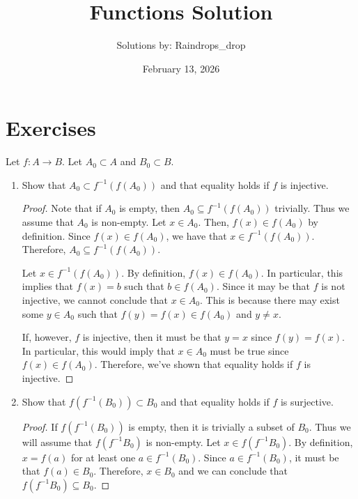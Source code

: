 \documentclass[12pt]{article}
\begin{document}

\title{Functions Solution}
\author{Solutions by: Raindrops\_drop}
\date{February 13, 2026}
\maketitle

\section*{Exercises}

 Let $f: A \to B$. Let $A_0 \subset A$ and $B_0 \subset B$.
\begin{enumerate}[label=(\alph*)]
	\item Show that $A_0 \subset f^{-1}(f(A_0))$ and that equality holds if $f$ is 
	injective.
	\begin{proof}
		Note that if $A_0$ is empty, then $A_0 \subseteq f^{-1}(f(A_0))$ trivially.
		Thus we assume that $A_0$ is non-empty. Let $x \in A_0$. Then, $f(x) \in f(A_0)$
		by definition. Since $f(x) \in f(A_0)$, we have that $x \in f^{-1}(f(A_0))$.
		Therefore, $A_0 \subseteq f^{-1}(f(A_0))$.
		
		Let $x \in f^{-1}(f(A_0))$. By definition, $f(x) \in f(A_0)$. In particular, this
		implies that $f(x) = b$ such that $b \in f(A_0)$. Since it may be that $f$ is 
		not injective, we cannot conclude that $x \in A_0$. This is because there
		may exist some $y \in A_0$ such that $f(y) = f(x) \in f(A_0)$ and $y \neq x$.
		
		If, however, $f$ is injective, then it must be that $y = x$ since $f(y) = f(x)$.
		In particular, this would imply that $x \in A_0$ must be true since $f(x) \in f(A_0)$.
		Therefore, we've shown that equality holds if $f$ is injective.
	\end{proof}
	 
	\item Show that $f(f^{-1}(B_0)) \subset B_0$ and that equality holds if $f$ is 
	surjective. 
	\begin{proof}
		If $f(f^{-1}(B_0))$ is empty, then it is trivially a subset of $B_0$. Thus we 
		will assume that $f(f^{-1}B_0)$ is non-empty. Let $x \in f(f^{-1} B_0)$.
		By definition, $x = f(a)$ for at least one $a \in f^{-1}(B_0)$. Since 
		$a \in f^{-1}(B_0)$, it must be that $f(a) \in B_0$. Therefore, $x \in B_0$
		and we can conclude that $f(f^{-1} B_0) \subseteq B_0$.
		

\end{proof}
\end{enumerate}
\end{document}

